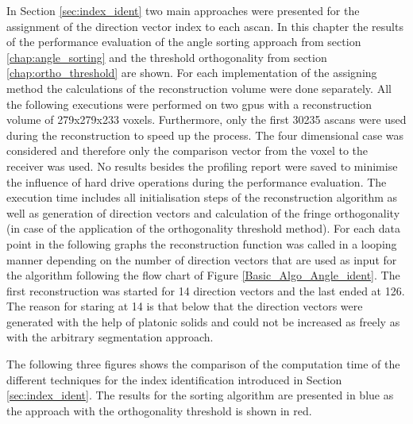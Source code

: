 In Section \ref{sec:index_ident} two main approaches were presented for the assignment of the direction vector index to each \ac{ascan}. In this chapter the results of the performance evaluation of the angle sorting approach from section \ref{chap:angle_sorting} and the threshold orthogonality from section \ref{chap:ortho_threshold} are shown. For each implementation of the assigning method the calculations of the reconstruction volume were done separately. All the following executions were performed on two \acp{gpu} with a reconstruction volume of 279x279x233 voxels. Furthermore, only the first 30235 \acp{ascan} were used during the reconstruction to speed up the process. The four dimensional case was considered and therefore only the comparison vector from the voxel to the receiver was used. No results besides the profiling report were saved to minimise the influence of hard drive operations during the performance evaluation. The execution time includes all initialisation steps of the reconstruction algorithm as well as generation of direction vectors and calculation of the fringe orthogonality (in case of the application of the orthogonality threshold method). For each data point in the following graphs the reconstruction function was called in a looping manner depending on the number of direction vectors that are used as input for the algorithm following the flow chart of Figure \ref{Basic_Algo_Angle_ident}. The first reconstruction was started for 14 direction vectors and the last ended at 126. The reason for staring at 14 is that below that the direction vectors were generated with the help of platonic solids and could not be increased as freely as with the arbitrary segmentation approach.

The following three figures shows the comparison of the computation time of the different techniques for the index identification introduced in Section \ref{sec:index_ident}. The results for the sorting algorithm are presented in blue as the approach with the orthogonality threshold is shown in red.

